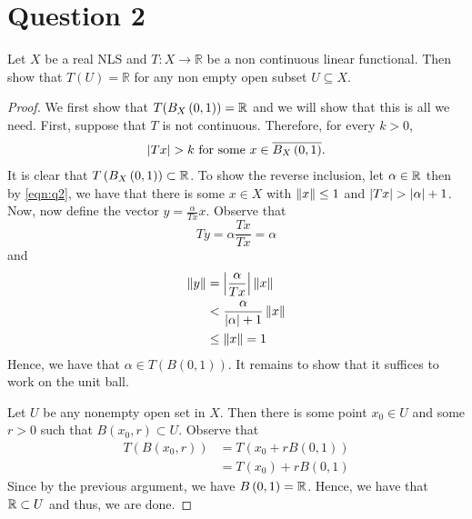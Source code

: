 \section{Question 2}
\horz
Let $X$ be a real NLS and  $T: X \rightarrow \mathbb R$ be a non continuous linear functional. Then show that $T(U) = \mathbb R$ for any non empty open subset $U \subseteq X.$
\horz
\begin{proof}
    We first show that $T(B_{X} \left( 0,1 \right) )= \mathbb R$ and we will show that this is all we need. First, suppose that $T$ is not continuous. Therefore, for every $k > 0$,
    \begin{align}
	\left\lvert Tx \right\rvert > k \text{ for some } x \in \overline{B_{X} \left( 0,1 \right)}\text{.}
	\label{eqn:q2}
    \end{align}
    It is clear that $T\left( B_{X} \left( 0,1 \right) \right) \subset \mathbb R$. To show the reverse inclusion, let $\alpha \in \mathbb R$ then by \ref{eqn:q2}, we have that there is some $x\in X$ with $\left\lVert x \right\rVert \le 1$ and $\left\lvert Tx \right\rvert > \left\lvert \alpha \right\rvert+1$. Now, now define the vector $y=\frac{\alpha}{Tx} x$. Observe that 
    \begin{equation*}
	Ty = \alpha \frac{Tx}{Tx} = \alpha
    \end{equation*}
    and 
    \begin{align*}
	\left\lVert y \right\rVert &= \left\lvert \frac{\alpha}{Tx} \right\rvert \left\lVert x \right\rVert \\
	&< \frac{\alpha}{\left\lvert \alpha \right\rvert +1} \left\lVert x \right\rVert \\
	&\le \left\lVert x \right\rVert =1
    \end{align*}
    Hence, we have that $\alpha \in T\left( B\left( 0,1 \right) \right)$. It remains to show that it suffices to work on the unit ball.

    Let $U$ be any nonempty open set in $X$. Then there is some point $x_{0} \in U$ and some $r > 0$ such that $B\left( x_{0},r \right) \subset U$. Observe that
    \begin{align*}
	T\left( B\left( x_{0},r \right) \right) &=  T \left( x_{0} + r B\left( 0,1 \right) \right) \\
	&= T(x_{0}) + r B\left( 0,1 \right)
    \end{align*}
    Since by the previous argument, we have $B\left( 0,1 \right) = \mathbb R$. Hence, we have that $\mathbb R \subset U$ and thus, we are done.
\end{proof}
